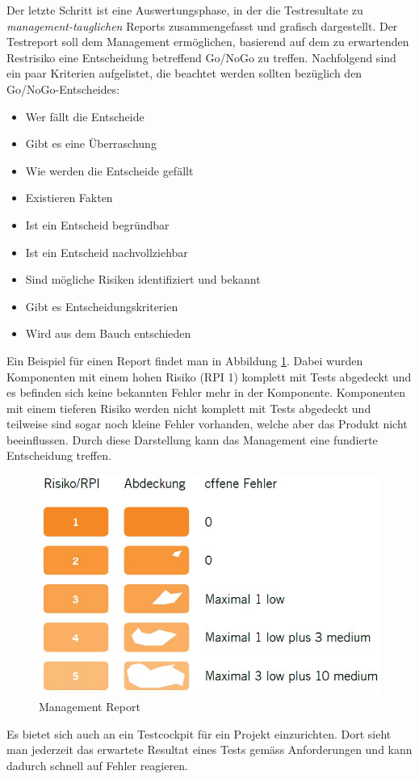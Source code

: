 Der letzte Schritt ist eine Auswertungsphase, in der die Testresultate zu \textit{management-tauglichen} Reports zusammengefasst und grafisch dargestellt. Der Testreport soll dem Management ermöglichen, basierend auf dem zu erwartenden Restrisiko eine Entscheidung betreffend Go/NoGo zu treffen. Nachfolgend sind ein paar Kriterien aufgelistet, die beachtet werden sollten bezüglich den Go/NoGo-Entscheides:
\begin{itemize}
	\item Wer fällt die Entscheide
	\item Gibt es eine Überraschung
	\item Wie werden die Entscheide gefällt
	\item Existieren Fakten
	\item Ist ein Entscheid begründbar
	\item Ist ein Entscheid nachvollziehbar
	\item Sind mögliche Risiken identifiziert und bekannt
	\item Gibt es Entscheidungskriterien
	\item Wird aus dem Bauch entschieden
\end{itemize}
Ein Beispiel für einen Report findet man in Abbildung \ref{fig:go-nogo-report}. Dabei wurden Komponenten mit einem hohen Risiko (RPI 1) komplett mit Tests abgedeckt und es befinden sich keine bekannten Fehler mehr in der Komponente. Komponenten mit einem tieferen Risiko werden nicht komplett mit Tests abgedeckt und teilweise sind sogar noch kleine Fehler vorhanden, welche aber das Produkt nicht beeinflussen. Durch diese Darstellung kann das Management eine fundierte Entscheidung treffen.
\begin{figure}[h!]
\centering
\includegraphics[width=0.6\linewidth]{fig/go-nogo-report}
\caption{Management Report}
\label{fig:go-nogo-report}
\end{figure}

Es bietet sich auch an ein Testcockpit für ein Projekt einzurichten. Dort sieht man jederzeit das erwartete Resultat eines Tests gemäss Anforderungen und kann dadurch schnell auf Fehler reagieren.

